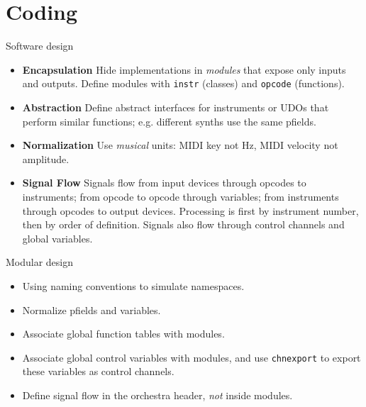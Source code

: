 \documentclass{beamer}
\begin{document}
\section{Coding}
\begin{frame}{Software design}
\begin{itemize}
\item \textbf{Encapsulation} Hide implementations in \textit{modules} that
expose only inputs and outputs. Define modules with \texttt{instr} (classes) and
\texttt{opcode} (functions).
\item \textbf{Abstraction} Define abstract interfaces for instruments or
UDOs that perform similar functions; e.g. different synths use the same
pfields.
\item \textbf{Normalization} Use \textit{musical} units: MIDI key not
Hz, MIDI velocity not amplitude.
\item \textbf{Signal Flow} Signals flow from input devices through
opcodes to instruments; from opcode to opcode through variables; from
instruments through opcodes to output devices. Processing is first by
instrument number, then by order of definition. Signals also flow through
control channels and global variables.
\end{itemize}
\end{frame}

\begin{frame}{Modular design}
\begin{itemize}
\item Using naming conventions to simulate namespaces.
\item Normalize pfields and variables.
\item Associate global function tables with modules.
\item Associate global control variables with modules, and use
\texttt{chnexport} to export these variables as control channels.
\item Define signal flow in the orchestra header, \textit{not} inside modules.
\end{itemize}
\end{frame}
\end{document}
